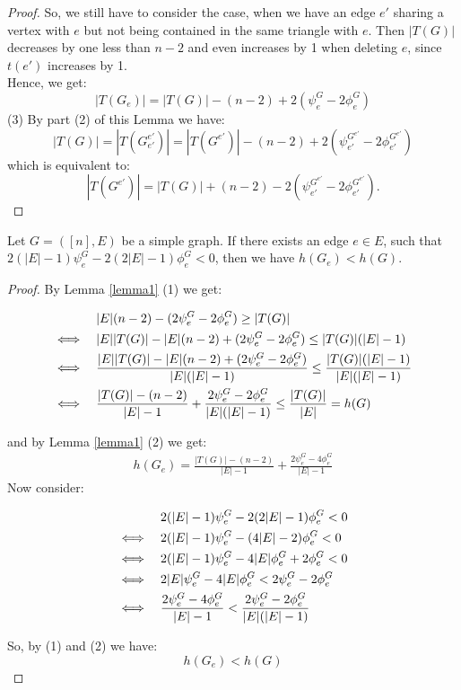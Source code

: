 \begin{lem}
\begin{proof}
So, we still have to consider the case, when we have an edge \(e'\) sharing a vertex with \(e\) but not being contained in the same triangle with \(e\). Then \(|T(G)|\) decreases by one less than \(n-2\) and even increases by 1 when deleting \(e\), since \(t(e')\) increases by 1.\\
Hence, we get:
\[
|T(G_e)|=|T(G)|-(n-2)+2(\psi_e^G-2\phi_e^G)
\]
(3) By part (2) of this Lemma we have:
\[
|T(G)|=|T(G_{e'}^{e'})|=|T(G^{e'})|-(n-2)+2(\psi_{e'}^{G^{e'}}-2\phi_{e'}^{G^{e'}})
\]
which is equivalent to:
\[
|T(G^{e'})|=|T(G)|+(n-2)-2(\psi_{e'}^{G^{e'}}-2\phi_{e'}^{G^{e'}}).
\]
\end{proof}
\end{lem}
\begin{prop}\label{proposition1}
Let \(G=([n],E)\) be a simple graph. If there exists an edge \(e\in E\), such that \(2(|E|-1)\psi_e^G-2(2|E|-1)\phi_e^G<0\), then we have \(h(G_e)<h(G)\).
\begin{proof}
By Lemma \ref{lemma1} (1) we get:
\begin{doublespace}
\begin{align}
&\quad\quad\quad\:\, |E|(n-2)-(2\psi_e^G-2\phi_e^G)\geq |T(G)|\notag\\
&\Longleftrightarrow\quad |E||T(G)|-|E|(n-2)+(2\psi_e^G-2\phi_e^G)\leq |T(G)|(|E|-1)\notag\\
&\Longleftrightarrow\quad \frac{|E||T(G)|-|E|(n-2)+(2\psi_e^G-2\phi_e^G)}{|E|(|E|-1)}\leq\frac{|T(G)|(|E|-1)}{|E|(|E|-1)}\notag\\
&\Longleftrightarrow\quad \frac{|T(G)|-(n-2)}{|E|-1}+\frac{2\psi_e^G-2\phi_e^G}{|E|(|E|-1)}\leq\frac{|T(G)|}{|E|}=h(G)
\end{align}
\end{doublespace}
and by Lemma \ref{lemma1} (2) we get:
\begin{align}
h(G_e)=\frac{|T(G)|-(n-2)}{|E|-1}+\frac{2\psi_e^G-4\phi_e^G}{|E|-1}
\end{align}
Now consider:
\begin{doublespace}
\begin{align}
&\quad\quad\quad\:\, 2(|E|-1)\psi_e^G-2(2|E|-1)\phi_e^G<0\notag\\
&\Longleftrightarrow\quad 2(|E|-1)\psi_e^G-(4|E|-2)\phi_e^G<0\notag\\
&\Longleftrightarrow\quad 2(|E|-1)\psi_e^G-4|E|\phi_e^G+2\phi_e^G<0\notag\\
&\Longleftrightarrow\quad 2|E|\psi_e^G-4|E|\phi_e^G<2\psi_e^G-2\phi_e^G\notag\\
&\Longleftrightarrow\quad \frac{2\psi_e^G-4\phi_e^G}{|E|-1}<\frac{2\psi_e^G-2\phi_e^G}{|E|(|E|-1)}\notag
\end{align}
\end{doublespace}
So, by (1) and (2) we have:
\[
h(G_e)<h(G)
\]
\end{proof}
\end{prop}
